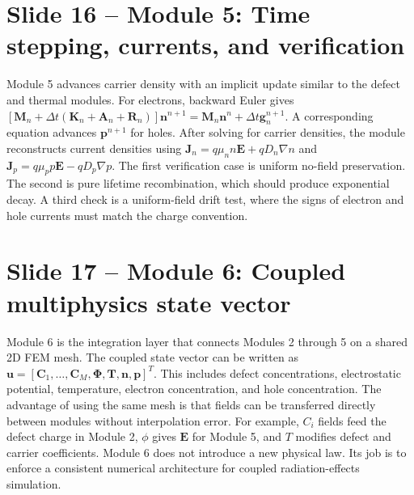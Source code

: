 \documentclass[11pt]{article}
\newcommand{\grad}{\nabla}
\newcommand{\E}{\bm{E}}
\newcommand{\J}{\bm{J}}
\newcommand{\mat}[1]{\mathbf{#1}}
\newcommand{\vect}[1]{\bm{#1}}
\begin{document}
\section*{Slide 16 -- Module 5: Time stepping, currents, and verification}
\begin{scriptbox}
Module 5 advances carrier density with an implicit update similar to the defect and thermal modules. For electrons, backward Euler gives \([\mat{M}_n+\Delta t(\mat{K}_n+\mat{A}_n+\mat{R}_n)]\vect{n}^{n+1}=\mat{M}_n\vect{n}^n+\Delta t\vect{g}_n^{n+1}\). A corresponding equation advances \(\vect{p}^{n+1}\) for holes. After solving for carrier densities, the module reconstructs current densities using \(\J_n=q\mu_nn\E+qD_n\grad n\) and \(\J_p=q\mu_pp\E-qD_p\grad p\). The first verification case is uniform no-field preservation. The second is pure lifetime recombination, which should produce exponential decay. A third check is a uniform-field drift test, where the signs of electron and hole currents must match the charge convention.
\end{scriptbox}

\section*{Slide 17 -- Module 6: Coupled multiphysics state vector}
\begin{scriptbox}
Module 6 is the integration layer that connects Modules 2 through 5 on a shared 2D FEM mesh. The coupled state vector can be written as \(\vect{u}=[\vect{C}_1,\ldots,\vect{C}_M,\vect{\Phi},\vect{T},\vect{n},\vect{p}]^T\). This includes defect concentrations, electrostatic potential, temperature, electron concentration, and hole concentration. The advantage of using the same mesh is that fields can be transferred directly between modules without interpolation error. For example, \(C_i\) fields feed the defect charge in Module 2, \(\phi\) gives \(\E\) for Module 5, and \(T\) modifies defect and carrier coefficients. Module 6 does not introduce a new physical law. Its job is to enforce a consistent numerical architecture for coupled radiation-effects simulation.
\end{scriptbox}
\end{document}
